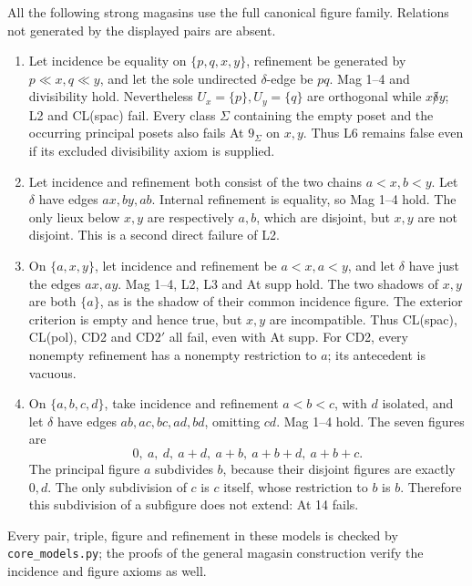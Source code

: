 \begin{counterexample}
\label{SA21-B-L6-countermodels}
All the following strong magasins use the full canonical figure
family. Relations not generated by the displayed pairs are absent.
\begin{enumerate}
\item Let incidence be equality on \(\{p,q,x,y\}\), refinement be
generated by \(p\ll x,q\ll y\), and let the sole undirected
\(\delta\)-edge be \(pq\). Mag 1--4 and divisibility hold.
Nevertheless \(U_x=\{p\},U_y=\{q\}\) are orthogonal while
\(x\not\delta y\); L2 and CL(spac) fail. Every class \(\Sigma\)
containing the empty poset and the occurring principal posets also
fails At \(9_\Sigma\) on \(x,y\). Thus L6 remains false even if
its excluded divisibility axiom is supplied.
\item Let incidence and refinement both consist of the two chains
\(a<x,b<y\). Let \(\delta\) have edges \(ax,by,ab\).
Internal refinement is equality, so Mag 1--4 hold. The only lieux
below \(x,y\) are respectively \(a,b\), which are disjoint, but
\(x,y\) are not disjoint. This is a second direct failure of L2.
\item On \(\{a,x,y\}\), let incidence and refinement be
\(a<x,a<y\), and let \(\delta\) have just the edges \(ax,ay\).
Mag 1--4, L2, L3 and At supp hold. The two shadows of \(x,y\)
are both \(\{a\}\), as is the shadow of their common incidence
figure. The exterior criterion is empty and hence true, but
\(x,y\) are incompatible. Thus CL(spac), CL(pol), CD2 and
\(\mathrm{CD2}'\) all fail, even with At supp. For CD2, every nonempty refinement
has a nonempty restriction to \(a\); its antecedent is vacuous.
\item On \(\{a,b,c,d\}\), take incidence and refinement
\(a<b<c\), with \(d\) isolated, and let \(\delta\) have edges
\(ab,ac,bc,ad,bd\), omitting \(cd\). Mag 1--4 hold.
The seven figures are
\[
 0,\ a,\ d,\ a+d,\ a+b,\ a+b+d,\ a+b+c.
\]
The principal figure \(a\) subdivides \(b\), because their disjoint
figures are exactly \(0,d\). The only subdivision of \(c\) is \(c\)
itself, whose restriction to \(b\) is \(b\). Therefore this
subdivision of a subfigure does not extend: At 14 fails.
\end{enumerate}
Every pair, triple, figure and refinement in these models is checked
by \texttt{core\_models.py}; the proofs of the general magasin
construction verify the incidence and figure axioms as well.
\end{counterexample}

